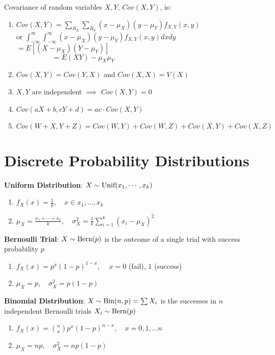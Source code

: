 \documentclass[12pt, a4paper]{article}
\begin{document}
\begin{multicols*}{3}
Covariance of random variables $X, Y$, $Cov(X, Y)$, is:
\begin{enumerate}[\roman*.]
  \item $Cov(X, Y) = \sum_{R_X}\sum_{R_Y}(x-\mu_X)(y-\mu_Y)f_{X, Y}(x, y)$\\\quad\quad\quad or $\int^{\infty}_{-\infty}\int^{\infty}_{-\infty} (x-\mu_{X})(y-\mu_{Y})f_{X, Y}(x, y)dxdy$\\\quad\quad\quad\quad\quad$=E[(X-\mu_X)(Y-\mu_Y)]$\\$\quad\quad\quad\quad\quad=E(XY)-\mu_X\mu_Y$
  \item $Cov(X, Y) = Cov(Y, X)$ and $Cov(X, X) = V(X)$
  \item $X, Y$ are independent $\implies$ $Cov(X, Y) = 0$
  \item $Cov(aX + b, cY+d) = ac\cdot Cov(X,Y)$
  \item $Cov(W+X, Y+Z) = Cov(W, Y) + Cov(W, Z) + Cov(X, Y) + Cov(X, Z)$
\end{enumerate}
\vspace{-1em}
\colbreak
\section{Discrete Probability Distributions}
\textbf{Uniform Distribution}: $X \sim \text{Unif}({x_1,\cdots,x_k})$
\begin{enumerate}[\roman*.]
  \item $f_X(x) = \frac{1}{k},\quad x \in {x_1,\dots,x_k}$
  \item $\mu_X = \frac{x_1+\cdots+x_k}{k},\quad\sigma^2_X = \frac{1}{k}\sum^k_{i=1}(x_i-\mu_X)^2$
\end{enumerate}

\textbf{Bernoulli Trial}: $X \sim \text{Bern}(p)$ is the outcome of a single trial with success probability $p$
\begin{enumerate}[\roman*.]
  \item $f_X(x) = p^x(1-p)^{1-x}$, $\quad x=0$ (fail), $1$ (success)
  \item $\mu_X = p,\quad \sigma^2_X = p(1-p)$
\end{enumerate}

\textbf{Binomial Distribution}: $X \sim \text{Bin}(n, p) = \sum X_i$ is the successes in $n$ independent Bernoulli trials $X_i \sim \text{Bern}(p)$
\begin{enumerate}[\roman*.]
  \item $f_X(x) = \binom nx p^x(1-p)^{n-x},\quad x=0,1,\dots n$
  \item $\mu_X = np,\quad \sigma^2_X = np(1-p)$
\end{enumerate}


\end{multicols*}
\end{document}
